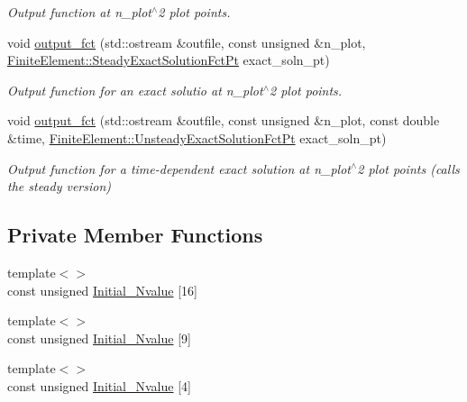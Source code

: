 \begin{DoxyCompactItemize}
\begin{DoxyCompactList}\small\item\em Output function at n\+\_\+plot$^\wedge$2 plot points. \end{DoxyCompactList}\item 
void \hyperlink{classoomph_1_1QYoungLaplaceElement_a617863102f725a73a8768ba8e3da896d}{output\+\_\+fct} (std\+::ostream \&outfile, const unsigned \&n\+\_\+plot, \hyperlink{classoomph_1_1FiniteElement_a690fd33af26cc3e84f39bba6d5a85202}{Finite\+Element\+::\+Steady\+Exact\+Solution\+Fct\+Pt} exact\+\_\+soln\+\_\+pt)
\begin{DoxyCompactList}\small\item\em Output function for an exact solutio at n\+\_\+plot$^\wedge$2 plot points. \end{DoxyCompactList}\item 
void \hyperlink{classoomph_1_1QYoungLaplaceElement_adfb61689825789e178eeb2985c4985e8}{output\+\_\+fct} (std\+::ostream \&outfile, const unsigned \&n\+\_\+plot, const double \&time, \hyperlink{classoomph_1_1FiniteElement_ad4ecf2b61b158a4b4d351a60d23c633e}{Finite\+Element\+::\+Unsteady\+Exact\+Solution\+Fct\+Pt} exact\+\_\+soln\+\_\+pt)
\begin{DoxyCompactList}\small\item\em Output function for a time-\/dependent exact solution at n\+\_\+plot$^\wedge$2 plot points (calls the steady version) \end{DoxyCompactList}\end{DoxyCompactItemize}
\subsection*{Private Member Functions}
\begin{DoxyCompactItemize}
\item 
{\footnotesize template$<$$>$ }\\const unsigned \hyperlink{classoomph_1_1QYoungLaplaceElement_ada56c2f1492ee7a00b7dc30f8367528d}{Initial\+\_\+\+Nvalue} \mbox{[}16\mbox{]}
\item 
{\footnotesize template$<$$>$ }\\const unsigned \hyperlink{classoomph_1_1QYoungLaplaceElement_acbf4023d0292401b32f49d2a51aadd1b}{Initial\+\_\+\+Nvalue} \mbox{[}9\mbox{]}
\item 
{\footnotesize template$<$$>$ }\\const unsigned \hyperlink{classoomph_1_1QYoungLaplaceElement_a3597beefabf25fc881b4b5e4fbe4d143}{Initial\+\_\+\+Nvalue} \mbox{[}4\mbox{]}
\end{DoxyCompactItemize}
